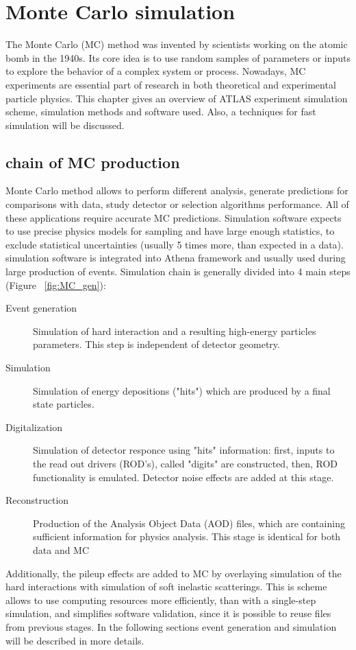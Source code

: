 
\chapter{Monte Carlo simulation}\label{chap:MC}
The Monte Carlo (MC) method was invented by scientists working on the atomic bomb in the 1940s. Its core idea is to use random samples of parameters or inputs to explore the behavior of a complex system or process.  Nowadays, MC experiments are essential part of research in both theoretical and experimental particle physics.
This chapter gives an overview of ATLAS experiment simulation scheme, simulation methods and software used. Also, a techniques for fast simulation will be discussed. 

\section{\atlas chain of MC production}

\begin{figure}[h]
\end{figure}

Monte Carlo method allows to perform different analysis, generate predictions for comparisons with data, study detector or selection algorithms performance. All of these applications require accurate MC predictions. Simulation software expects to use precise physics models for sampling and have large enough statistics, to exclude statistical uncertainties (usually 5 times more, than expected in a data). \atlas simulation software is integrated into Athena framework and usually used during large production of events. Simulation chain is generally divided into 4 main steps (Figure ~\ref{fig:MC_gen}):
\begin{description}
\item[Event generation]Simulation of hard interaction and a resulting high-energy particles parameters. This step is independent of \atlas detector geometry.
\item[Simulation]Simulation of energy depositions ("hits") which are produced by a final state particles.
\item[Digitalization] Simulation of detector responce using "hits" information:  first, inputs to the read out drivers (ROD's), called "digits" are constructed, then, ROD functionality is emulated. Detector noise effects are added at this stage. 
\item[Reconstruction] Production of the Analysis Object Data (AOD) files, which are containing sufficient information for physics analysis. This stage is identical for both data and MC
\end{description}
Additionally, the pileup effects are added to MC by overlaying simulation of the hard interactions with simulation of soft inelastic scatterings. This is scheme allows to use computing resources more efficiently, than with a single-step simulation, and simplifies software validation, since it is possible to reuse files from previous stages. In the following sections event generation and simulation will be described in more details.


